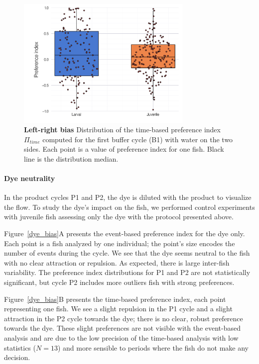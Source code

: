     \begin{figure}[h]
      \centering
      \includegraphics[width=0.75\textwidth]{part_2/assets/ld_bias.png}
      \caption{\textbf{Left-right bias} Distribution of the time-based preference index $\Pi_{time}$ computed for the first buffer cycle (B1) with water on the two sides. Each point is a value of preference index for one fish. Black line is the distribution median.}
      \label{ld_bias}
    \end{figure}

  \paragraph{Dye neutrality} In the product cycles P1 and P2, the dye is diluted with the product to visualize the flow. To study the dye's impact on the fish, we performed control experiments with juvenile fish assessing only the dye with the protocol presented above.

  Figure~\ref{dye_bias}A presents the event-based preference index for the dye only. Each point is a fish analyzed by one individual; the point's size encodes the number of events during the cycle. We see that the dye seems neutral to the fish with no clear attraction or repulsion. As expected, there is large inter-fish variability. The preference index distributions for P1 and P2 are not statistically significant, but cycle P2 includes more outliers fish with strong preferences.

  Figure~\ref{dye_bias}B presents the time-based preference index, each point representing one fish. We see a slight repulsion in the P1 cycle and a slight attraction in the P2 cycle towards the dye; there is no clear, robust preference towards the dye. These slight preferences are not visible with the event-based analysis and are due to the low precision of the time-based analysis with low statistics ($N=13$) and more sensible to periods where the fish do not make any decision.

